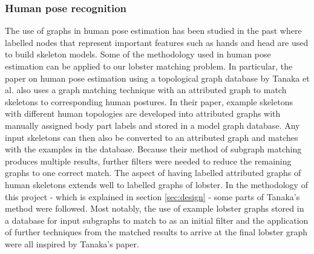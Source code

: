 \subsubsection{Human pose recognition}
The use of graphs in human pose estimation has been studied in the past
\cite{human-pose, human-skeleton} where labelled nodes that represent important features such as hands and head are used to build skeleton models.
\n
Some of the methodology used in human pose estimation can be applied to our lobster matching problem. In particular, the paper on human pose estimation using a topological graph database \cite{human-pose} by Tanaka et al. also uses a graph matching technique with an attributed graph to match skeletons to corresponding human postures. In their paper, example skeletons with different human topologies are developed into attributed graphs with manually assigned body part labels and stored in a model graph database. Any input skeletons can then also be converted to an attributed graph and matches with the examples in the database. Because their method of subgraph matching produces multiple results, further filters were needed to reduce the remaining graphs to one correct match. 
\noindent
The aspect of having labelled attributed graphs of human skeletons extends well to labelled graphs of lobster. In the methodology of this project - which is explained in section \ref{sec:design} - some parts of Tanaka's method were followed. Most notably, the use of example lobster graphs stored in a database for input subgraphs to match to as an initial filter and the application of further techniques from the matched results to arrive at the final lobster graph were all inspired by Tanaka's paper.
 
